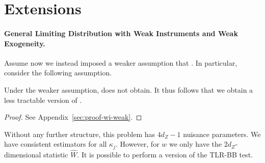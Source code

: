 




\section{Extensions}

\label{sec:extensions}


\paragraph*{General Limiting Distribution with Weak Instruments and Weak Exogeneity.}

Assume now we instead imposed a weaker assumption that . In particular, consider the following assumption.



\noindent
Under the weaker assumption,  does not obtain. It thus follows that we obtain a less tractable version of .



\begin{proof}
    See Appendix~\ref{sec:proof-wi-weak}.
\end{proof}
\noindent
Without any further structure, this problem has \(4d_Z-1\) nuisance parameters. We have consistent estimators for all \(\kappa_j\). However, for \(w\) we only have the \(2d_Z\)-dimensional statistic \(\hat W\). It is possible to perform a version of the TLR-BB test.

